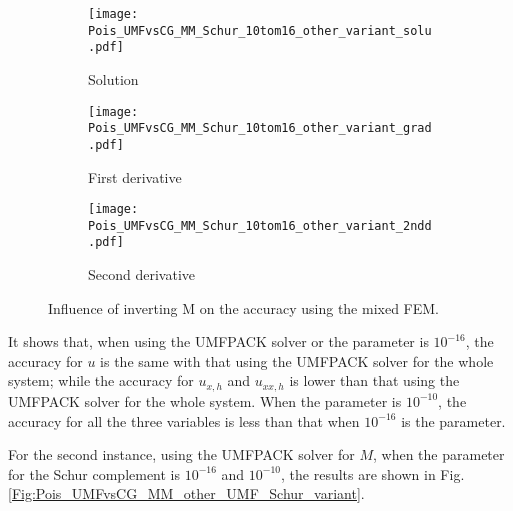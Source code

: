 \documentclass[final,3p]{elsarticle}
\begin{document}
\begin{figure}[!ht]
    \begin{subfigure}{5.5cm}
        \texttt{[image: Pois\_UMFvsCG\_MM\_Schur\_10tom16\_other\_variant\_solu.pdf]}
        \caption{Solution}
        \label{Fig:Pois_UMFvsCG_MM_Schur_10tom16_other_variant_solu}
    \end{subfigure}
    \begin{subfigure}{5.5cm}
        \texttt{[image: Pois\_UMFvsCG\_MM\_Schur\_10tom16\_other\_variant\_grad.pdf]}
        \caption{First derivative}
        \label{Fig:Pois_UMFvsCG_MM_Schur_10tom16_other_variant_grad}
    \end{subfigure}
    \begin{subfigure}{5.5cm}
        \texttt{[image: Pois\_UMFvsCG\_MM\_Schur\_10tom16\_other\_variant\_2ndd.pdf]}
        \caption{Second derivative}
        \label{Fig:Pois_UMFvsCG_MM_Schur_10tom16_other_variant_2ndd}
    \end{subfigure}
\caption{Influence of inverting M on the accuracy using the mixed FEM.}		%
\label{Fig:Pois_UMFvsCG_MM_Schur_10tom16_other_variant}
\end{figure}

It shows that, when using the UMFPACK solver or the parameter is $10^{-16}$, the accuracy for $u$ is the same with that using the UMFPACK solver for the whole system; while the accuracy for $u_{x,h}$ and $u_{xx,h}$ is lower than that using the UMFPACK solver for the whole system.
When the parameter is $10^{-10}$, the accuracy for all the three variables is less than that when $10^{-16}$ is the parameter. 

For the second instance, using the UMFPACK solver for $M$, when the parameter for the Schur complement is $10^{-16}$ and $10^{-10}$, the results are shown in Fig. \ref{Fig:Pois_UMFvsCG_MM_other_UMF_Schur_variant}.
\end{document}
